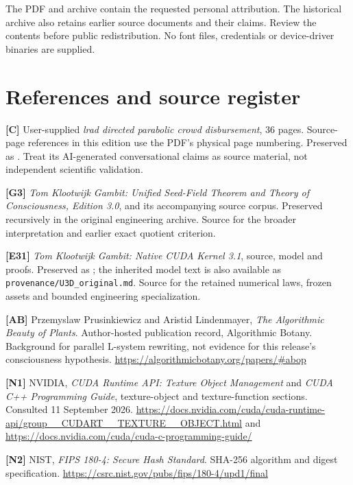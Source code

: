 \documentclass[11pt,a4paper]{article}
\begin{document}
The PDF and archive contain the requested personal attribution. The
historical archive also retains earlier source documents and their
claims. Review the contents before public redistribution. No font files,
credentials or device-driver binaries are supplied.

\clearpage
\section{References and source
register}\label{references-and-source-register}

\textbf{{[}C{]}} User-supplied \emph{lrad directed parabolic crowd
disbursement}, 36 pages. Source-page references in this edition use the
PDF's physical page numbering. Preserved as
. Treat its
AI-generated conversational claims as source material, not independent
scientific validation.

\textbf{{[}G3{]}} \emph{Tom Klootwijk Gambit: Unified Seed-Field Theorem
and Theory of Consciousness, Edition 3.0}, and its accompanying source
corpus. Preserved recursively in the original engineering archive.
Source for the broader interpretation and earlier exact quotient
criterion.

\textbf{{[}E31{]}} \emph{Tom Klootwijk Gambit: Native CUDA Kernel 3.1},
source, model and proofs. Preserved as
; the inherited model
text is also available as \texttt{provenance/U3D\_original.md}. Source
for the retained numerical laws, frozen assets and bounded engineering
specialization.

\textbf{{[}AB{]}} Przemyslaw Prusinkiewicz and Aristid Lindenmayer,
\emph{The Algorithmic Beauty of Plants}. Author-hosted publication
record, Algorithmic Botany. Background for parallel L-system rewriting,
not evidence for this release's consciousness hypothesis.
\url{https://algorithmicbotany.org/papers/\#abop}

\textbf{{[}N1{]}} NVIDIA, \emph{CUDA Runtime API: Texture Object
Management} and \emph{CUDA C++ Programming Guide}, texture-object and
texture-function sections. Consulted 11 September 2026.
\url{https://docs.nvidia.com/cuda/cuda-runtime-api/group__CUDART__TEXTURE__OBJECT.html}
and \url{https://docs.nvidia.com/cuda/cuda-c-programming-guide/}

\textbf{{[}N2{]}} NIST, \emph{FIPS 180-4: Secure Hash Standard}. SHA-256
algorithm and digest specification.
\url{https://csrc.nist.gov/pubs/fips/180-4/upd1/final}
\end{document}
